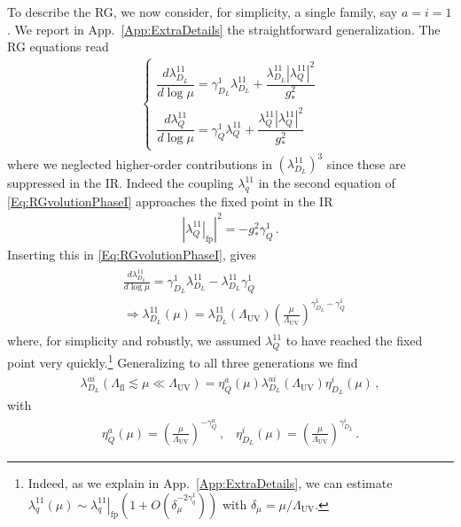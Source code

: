 \documentclass[aps,prl,twocolumn,showpacs,10pt,preprintnumbers,nofootinbib]{revtex4-2}
\newcommand{\gst}{g_*}
\newcommand{\Lfl}{\Lambda_{\text{fl}}}
\newcommand{\LUV}{\Lambda_{\text{UV}}}
\newcommand{\fp}[1]{{\left.#1\right|_{\text{fp}}}}
\begin{document}
To describe the RG, we now consider, for simplicity, a single family, say $a = i = 1$. We report in App.~\ref{App:ExtraDetails} the straightforward generalization. The RG equations read
\begin{align}\label{Eq:RGvolutionPhaseI}
\begin{cases}
    \dfrac{d \lambda_{D_L}^{11}}{d \log \mu} = \gamma_{D_L}^{1} \lambda_{D_L}^{11} + \dfrac{\lambda_{D_L}^{11} |\lambda_Q^{11}|^2}{g_*^2} \\[10pt]
    \dfrac{d \lambda_{Q}^{11}}{d \log \mu} = \gamma_Q^1 \lambda_{Q}^{11} + \dfrac{\lambda_{Q}^{11} | \lambda_Q^{11}|^2}{g_*^2}
\end{cases}
\end{align}
where we neglected higher-order contributions in $(\lambda_{D_L}^{11})^3$ since these are suppressed in the IR. Indeed the coupling $\lambda_q^{11}$ in the second equation of \eqref{Eq:RGvolutionPhaseI} approaches the fixed point in the IR
\begin{align}\label{Eq:FixPointq}
|\fp{\lambda_Q^{11}}|^2= -\gst^2 \gamma_{Q}^1\,.
\end{align}
Inserting this in
\eqref{Eq:RGvolutionPhaseI}, gives
\begin{align}
\begin{aligned}
    &\frac{d \lambda_{D_L}^{11}}{d \log \mu} = \gamma_{D_L}^1 \lambda_{D_L}^{11} - \lambda_{D_L}^{11} \gamma_Q^{1}\\&\Rightarrow \lambda_{D_L}^{11}(\mu)=\lambda_{D_L}^{11}(\LUV)\left(\frac{\mu}{\LUV} \right)^{\gamma_{D_L}^1 - \gamma_Q^1}\,
\end{aligned}
\end{align}
where, for simplicity and robustly, we assumed $\lambda_{Q}^{11}$ to have reached the fixed point very quickly.\footnote{Indeed, as we explain in App.~\ref{App:ExtraDetails}, we can estimate $\lambda^{11}_{q}(\mu)\sim \fp{\lambda^{11}_{q}}\left(1+O\left(\delta_{\mu}^{-2\gamma_q^1}\right)\right)$ with $\delta_{\mu} =  \mu/\Lambda_{\text{UV}}$.}
Generalizing to all three generations we find
\begin{align}
    \lambda^{ai}_{D_L}(\Lfl\lesssim\mu \ll\LUV) = \eta_Q^a(\mu)\lambda^{ai}_{D_L}(\LUV) \eta_{D_L}^i(\mu)\,,
\end{align}
with
\begin{align}
    \eta_Q^a(\mu) = \left(\frac{\mu}{\LUV} \right)^{-\gamma_Q^a} \,, \,\,\,\,\, 
    \eta_{D_L}^i(\mu) = \left(\frac{\mu}{\LUV} \right)^{\gamma_{D_L}^i} \,.
\end{align}
\end{document}
